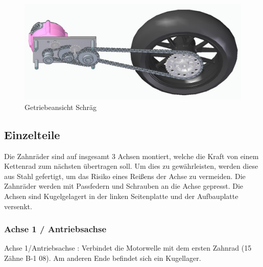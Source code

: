 \begin{figure} [H]
	\begin{center}
		\includegraphics[scale=0.5]{figures/mechanik/Getriebe_2.jpg}
			\caption{Getriebeansicht Schräg}
			\label{fig:Getriebeansicht Schräg}
	\end{center}
\end{figure}

\newpage

\subsection*{Einzelteile}

Die Zahnräder sind auf insgesamt 3 Achsen montiert, welche die Kraft von einem Kettenrad zum nächsten übertragen soll. Um dies zu gewährleisten, werden diese aus Stahl gefertigt, um das Risiko eines Reißens der Achse zu vermeiden. Die Zahnräder werden mit Passfedern und Schrauben an die Achse gepresst. Die Achsen sind Kugelgelagert in der linken Seitenplatte und der Aufbauplatte versenkt.

\subsubsection*{Achse 1 / Antriebsachse}

Achse 1/Antriebsachse :	Verbindet die Motorwelle mit dem ersten Zahnrad (15 Zähne B-1 08). Am anderen Ende befindet sich ein Kugellager.

